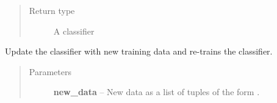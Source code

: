 \documentclass[letterpaper,10pt,english]{sphinxmanual}
\begin{document}
\begin{fulllineitems}
\begin{fulllineitems}
\begin{quote}\begin{description}
\item[{Return type}] \leavevmode
A classifier

\end{description}\end{quote}

\end{fulllineitems}


\begin{fulllineitems}
\label{api_reference:textblob.classifiers.NaiveBayesClassifier.update}
Update the classifier with new training data and re-trains the
classifier.
\begin{quote}\begin{description}
\item[{Parameters}] \leavevmode
\textbf{new\_data} -- New data as a list of tuples of the form
.

\end{description}\end{quote}

\end{fulllineitems}


\end{fulllineitems}

\end{document}
